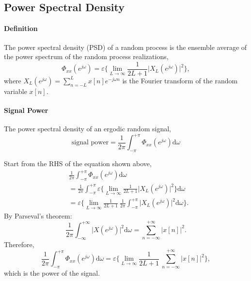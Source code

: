 \subsection{Power Spectral Density}
\paragraph{Definition} The power spectral density (PSD) of a random process is the ensemble average of the power spectrum of the random process realizations,
\[
    \Phi_{xx} (e^{j\omega}) = \varepsilon \bigg\{ \lim_{L\to\infty} \frac{1}{2L+1} \lvert X_{L}(e^{j\omega}) \rvert^2 \bigg\},
\]
where $X_{L}(e^{j\omega}) = \sum_{n=-L}^{L} x[n] e^{-j\omega n}$ is the Fourier transform of the random variable $x[n]$.

\paragraph{Signal Power} The power spectral density of an ergodic random signal,
\[ 
    \text{signal power} = \frac{1}{2\pi} \int_{-\pi}^{+\pi} \Phi_{xx}(e^{j\omega}) \mathrm{d}\omega
\]
\begin{dv}{}
Start from the RHS of the equation shown above,
\begin{align*}
    & \frac{1}{2\pi} \int_{-\pi}^{+\pi} \Phi_{xx}(e^{j\omega}) \mathrm{d}\omega \\
    & = \frac{1}{2\pi} \int_{-\pi}^{+\pi} \varepsilon \bigg\{ \lim_{L\to \infty} \frac{1} {2L+1} \lvert X_L (e^{j\omega}) \rvert^2 \bigg \} \mathrm{d}\omega \\
    & = \varepsilon \bigg\{ \lim_{L\to \infty} \frac{1} {2L+1} \ \frac{1}{2\pi} \int_{-\pi}^{+\pi} \lvert X_L (e^{j\omega}) \rvert^2 \mathrm{d}\omega \bigg\}.
\end{align*}
By Parseval's theorem:
\[
    \frac{1}{2\pi} \int_{-\infty}^{+\infty} \lvert X(e^{j\omega}) \rvert^2 \mathrm{d}\omega = \sum_{n=-\infty}^{+\infty} \lvert x[n] \rvert^2.
\]
Therefore, 
\[
    \frac{1}{2\pi} \int_{-\pi}^{+\pi} \Phi_{xx}(e^{j\omega}) \mathrm{d}\omega = \varepsilon \bigg\{ \lim_{L\to \infty} \frac{1} {2L+1} \ \sum_{n=-\infty}^{+\infty} \lvert x[n] \rvert^2 \bigg\},
\]
which is the power of the signal.
\end{dv}

